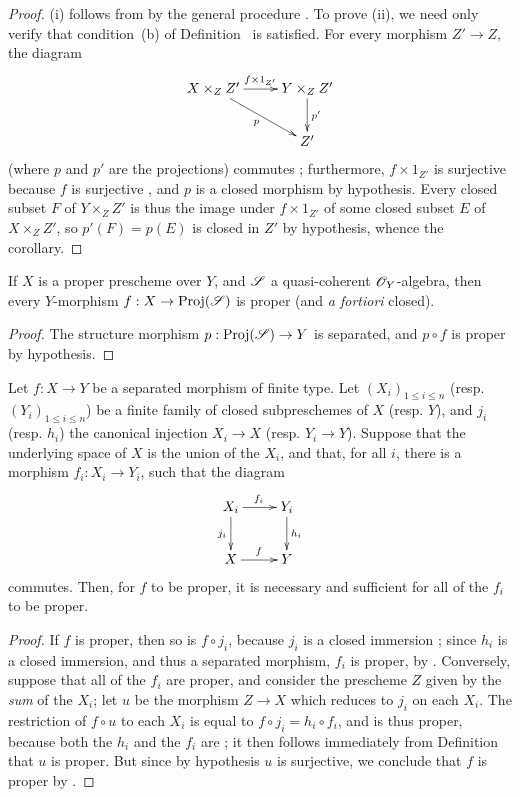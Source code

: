 \begin{proof}
(i) follows from  by the general procedure .
To prove (ii), we need only verify that condition~(b) of Definition~ is satisfied.
For every morphism $Z'\to Z$, the diagram
\[
  \xymatrix{
    X\times_Z Z'\ar[r]^{f\times1_{Z'}}\ar[dr]_p &
    Y\times_Z Z'\ar[d]^{p'}\\
    & Z'
  }
\]
(where $p$ and $p'$ are the projections) commutes ;
furthermore, $f\times1_{Z'}$ is surjective because $f$ is surjective , and $p$ is a closed morphism by hypothesis.
Every closed subset $F$ of $Y\times_Z Z'$ is thus the image under $f\times1_{Z'}$ of some closed subset $E$ of $X\times_Z Z'$, so $p'(F)=p(E)$ is closed in $Z'$ by hypothesis, whence the corollary.
\end{proof}

\begin{corollary}[5.4.4]
\label{II.5.4.4}
If $X$ is a proper prescheme over $Y$, and $\mathscr{S}$ a quasi-coherent $\mathscr{O}_Y$-algebra, then every $Y$-morphism $f:X\to\Proj(\sh{S})$ is proper (and \emph{a fortiori} closed).
\end{corollary}

\begin{proof}
The structure morphism $p:\Proj(\sh{S})\to Y$ is separated, and $p\circ f$ is proper by hypothesis.
\end{proof}

\begin{corollary}[5.4.5]
\label{II.5.4.5}
Let $f:X\to Y$ be a separated morphism of finite type.
Let $(X_i)_{1\leq i\leq n}$ (resp. $(Y_i)_{1\leq i\leq n}$) be a finite family of closed subpreschemes of $X$ (resp. $Y$), and $j_i$ (resp. $h_i$) the canonical injection $X_i\to X$ (resp. $Y_i\to Y$).
Suppose that the underlying space of $X$ is the union of the $X_i$, and that, for all $i$, there is a morphism $f_i:X_i\to Y_i$, such that the diagram
\[
  \xymatrix{
    X_i\ar[r]^{f_i}\ar[d]_{j_i} &
    Y_i\ar[d]^{h_i}\\
    X\ar[r]^f &
    Y
  }
\]
commutes.
Then, for $f$ to be proper, it is necessary and sufficient for all of the $f_i$ to be proper.
\end{corollary}

\begin{proof}
If $f$ is proper, then so is $f\circ j_i$, because $j_i$ is a closed immersion ;
since $h_i$ is a closed immersion, and thus a separated morphism, $f_i$ is proper, by .
Conversely, suppose that all of the $f_i$ are proper, and consider the prescheme $Z$ given by the \emph{sum} of the $X_i$; let $u$ be the morphism $Z\to X$ which reduces to $j_i$ on each $X_i$.
The restriction of $f\circ u$ to each $X_i$ is equal to $f\circ j_i=h_i\circ f_i$, and is thus proper, because both the $h_i$ and the $f_i$ are ;
it then follows immediately from Definition~ that $u$ is proper.
But since by hypothesis $u$ is surjective, we conclude that $f$ is proper by .
\end{proof}

